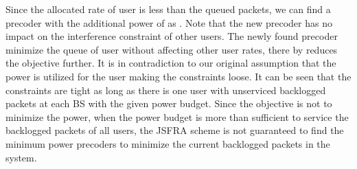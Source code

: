 Since the allocated rate of user  is less than the queued packets, we can find a precoder  with the additional power of  as . Note that the new precoder has no impact on the interference constraint of other users. The newly found precoder  minimize the queue of user  without affecting other user rates, there by reduces the objective further. It is in contradiction to our original assumption that the power is utilized for the user  making the constraints loose. It can be seen that the constraints are tight as long as there is one user with unserviced backlogged packets at each \ac{BS} with the given power budget. Since the objective is not to minimize the power, when the power budget is more than sufficient to service the backlogged packets of all users, the \ac{JSFRA} scheme is not guaranteed to find the minimum power precoders to minimize the current backlogged packets in the system.
